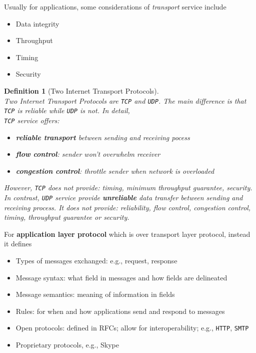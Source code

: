 \documentclass[12pt]{article}
\newtheorem{definition}{Definition}[section]
\theoremstyle{definition}
\begin{document}
Usually for applications, some considerations of \textit{transport} service include
\begin{itemize}
  \item Data integrity
  \item Throughput
  \item Timing
  \item Security
\end{itemize}
\begin{definition}[Two Internet Transport Protocols]
\hfill\\\normalfont Two Internet Transport Protocols are \texttt{TCP} and \texttt{UDP}. The main difference is that \texttt{TCP} is reliable while \texttt{UDP} is not. In detail, \\
\texttt{TCP} service offers:
\begin{itemize}
  \item \textbf{reliable transport} between sending and receiving pocess
  \item \textbf{flow control}: sender won't overwhelm receiver
  \item \textbf{congestion control}: throttle sender when network is overloaded
\end{itemize}
However, \texttt{TCP} does \textit{not} provide: timing, minimum throughput guarantee, security.\\
In contrast, \texttt{UDP} service provide \textbf{unreliable} data transfer between sending and receiving process. It does \textit{not} provide: reliability, flow control, congestion control, timing, throughput guarantee or security.
\end{definition}
For \textbf{application layer protocol} which is over transport layer protocol, instead it defines
\begin{itemize}
  \item Types of messages exchanged: e.g., request, response
  \item Message syntax: what field in messages and how fields are delineated
  \item Message semantics: meaning of information in fields
  \item Rules: for when and how applications send and respond to messages
  \item Open protocols: defined in RFCs; allow for interoperability; e.g., \texttt{HTTP}, \texttt{SMTP}
  \item Proprietary protocols, e.g., Skype
\end{itemize}
\end{document}
